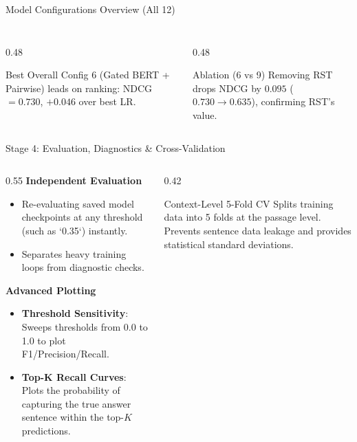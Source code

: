 \documentclass[aspectratio=169]{beamer}
\begin{document}
\begin{frame}{Model Configurations Overview (All 12)}
\begin{tabular}{c l l l l c c}
        \bottomrule
    \end{tabular}
    \vspace{0.2cm}
    \begin{columns}[t]
        \begin{column}{0.48\textwidth}
            \begin{block}{\scriptsize Best Overall}
                \scriptsize Config 6 (Gated BERT + Pairwise) leads on ranking: NDCG $= \mathbf{0.730}$, $+0.046$ over best LR.
            \end{block}
        \end{column}
        \begin{column}{0.48\textwidth}
            \begin{alertblock}{\scriptsize Ablation (6 vs 9)}
                \scriptsize Removing RST drops NDCG by $\mathbf{0.095}$ ($0.730 \to 0.635$), confirming RST's value.
            \end{alertblock}
        \end{column}
    \end{columns}
\end{frame}

\begin{frame}{Stage 4: Evaluation, Diagnostics \& Cross-Validation}
    \begin{columns}
        \begin{column}{0.55\textwidth}
            \textbf{Independent Evaluation}
            \begin{itemize}
                \item Re-evaluating saved model checkpoints at any threshold (such as `0.35`) instantly.
                \item Separates heavy training loops from diagnostic checks.
            \end{itemize}
            \vspace{0.2cm}
            \textbf{Advanced Plotting}
            \begin{itemize}
                \item \textbf{Threshold Sensitivity}: Sweeps thresholds from 0.0 to 1.0 to plot F1/Precision/Recall.
                \item \textbf{Top-K Recall Curves}: Plots the probability of capturing the true answer sentence within the top-$K$ predictions.
            \end{itemize}
        \end{column}
        
        \begin{column}{0.42\textwidth}
            \begin{block}{Context-Level 5-Fold CV}
                Splits training data into 5 folds at the passage level. Prevents sentence data leakage and provides statistical standard deviations.
            \end{block}
        \end{column}
    \end{columns}
\end{frame}
\end{document}
